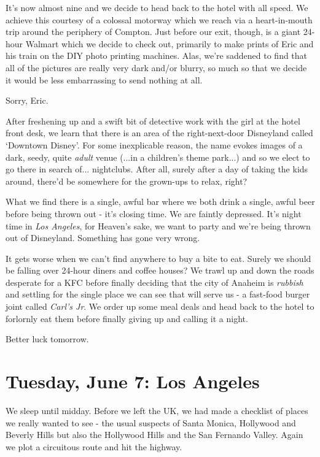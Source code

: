 \documentclass[a5paper,titlepage,11pt]{book}
\begin{document}
It's now almost nine and we decide to head back to the hotel with all speed. We achieve this courtesy of a colossal motorway which we reach via a heart-in-mouth trip around the periphery of Compton. Just before our exit, though, is a giant 24-hour Walmart which we decide to check out, primarily to make prints of Eric and his train on the DIY photo printing machines. Alas, we're saddened to find that all of the pictures are really very dark and/or blurry, so much so that we decide it would be less embarrassing to send nothing at all.

Sorry, Eric.

After freshening up and a swift bit of detective work with the girl at the hotel front desk, we learn that there is an area of the right-next-door Disneyland called `Downtown Disney'. For some inexplicable reason, the name evokes images of a dark, seedy, quite \emph{adult} venue (...in a children's theme park...) and so we elect to go there in search of... nightclubs. After all, surely after a day of taking the kids around, there'd be somewhere for the grown-ups to relax, right?

What we find there is a single, awful bar where we both drink a single, awful beer before being thrown out - it's closing time. We are faintly depressed. It's night time in \emph{Los Angeles}, for Heaven's sake, we want to party and we're being thrown out of Disneyland. Something has gone very wrong.

It gets worse when we can't find anywhere to buy a bite to eat. Surely we should be falling over 24-hour diners and coffee houses?  We trawl up and down the roads desperate for a KFC before finally deciding that the city of Anaheim is \emph{rubbish} and settling for the single place we can see that will serve us - a fast-food burger joint called \emph{Carl's Jr}. We order up some meal deals and head back to the hotel to forlornly eat them before finally giving up and calling it a night.

Better luck tomorrow.

\chapter[Los Angeles]{Tuesday, June 7:  Los Angeles}
We sleep until midday. Before we left the UK, we had made a checklist of places we really wanted to see - the usual suspects of Santa Monica, Hollywood and Beverly Hills but also the Hollywood Hills and the San Fernando Valley. Again we plot a circuitous route and hit the highway.
\end{document}
